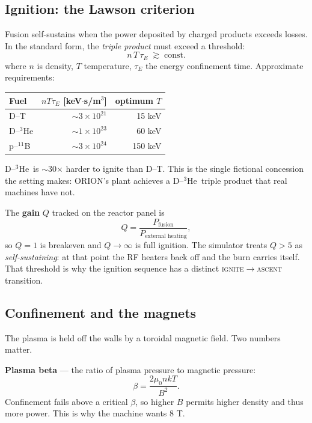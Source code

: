 \documentclass[11pt]{article}
\newcommand{\he}{\ensuremath{{}^3\mathrm{He}}}
\begin{document}
\subsection{Ignition: the Lawson criterion}
Fusion self-sustains when the power deposited by charged products exceeds losses. In the standard form, the \emph{triple product} must exceed a threshold:
\begin{equation}
\boxed{\;n\,T\,\tau_E \;\gtrsim\; \text{const.}\;}
\end{equation}
where $n$ is density, $T$ temperature, $\tau_E$ the energy confinement time. Approximate requirements:
\begin{center}\small
\begin{tabular}{@{}lrr@{}}
\toprule
Fuel & $nT\tau_E$ [keV$\cdot$s/m$^3$] & optimum $T$\\
\midrule
D--T   & $\sim3\times10^{21}$ & 15 keV\\
D--\he & $\sim1\times10^{23}$ & 60 keV\\
p--$^{11}$B & $\sim3\times10^{24}$ & 150 keV\\
\bottomrule
\end{tabular}
\end{center}
D--\he\ is $\sim$30$\times$ harder to ignite than D--T. This is the single fictional concession the setting makes: ORION's plant achieves a D--\he\ triple product that real machines have not.

The \textbf{gain} $Q$ tracked on the reactor panel is
\begin{equation}
Q = \frac{P_{\text{fusion}}}{P_{\text{external heating}}},
\end{equation}
so $Q=1$ is breakeven and $Q\to\infty$ is full ignition. The simulator treats $Q>5$ as \emph{self-sustaining}: at that point the RF heaters back off and the burn carries itself. That threshold is why the ignition sequence has a distinct \textsc{ignite}$\to$\textsc{ascent} transition.

\subsection{Confinement and the magnets}
The plasma is held off the walls by a toroidal magnetic field. Two numbers matter.

\textbf{Plasma beta} --- the ratio of plasma pressure to magnetic pressure:
\begin{equation}
\beta=\frac{2\mu_0 nkT}{B^2}.
\end{equation}
Confinement fails above a critical $\beta$, so higher $B$ permits higher density and thus more power. This is why the machine wants 8 T.
\end{document}

